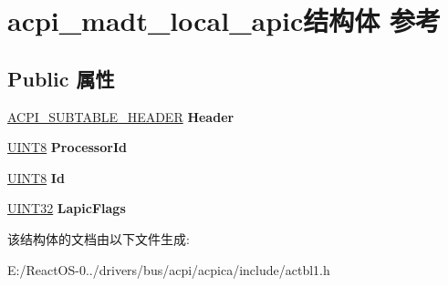 \hypertarget{structacpi__madt__local__apic}{}\section{acpi\+\_\+madt\+\_\+local\+\_\+apic结构体 参考}
\label{structacpi__madt__local__apic}
\subsection*{Public 属性}
\begin{DoxyCompactItemize}
\item 
\mbox{\label{structacpi__madt__local__apic_aeebea140ddc6fc6a265ee9de978cbe99}} 
\hyperlink{structacpi__subtable__header}{A\+C\+P\+I\+\_\+\+S\+U\+B\+T\+A\+B\+L\+E\+\_\+\+H\+E\+A\+D\+ER} {\bfseries Header}
\item 
\mbox{\label{structacpi__madt__local__apic_ae91b0a3cc43c5f7860c488665fadbc49}} 
\hyperlink{_processor_bind_8h_ab27e9918b538ce9d8ca692479b375b6a}{U\+I\+N\+T8} {\bfseries Processor\+Id}
\item 
\mbox{\label{structacpi__madt__local__apic_a42d0a74c710ebdbe1a39059320a18a0a}} 
\hyperlink{_processor_bind_8h_ab27e9918b538ce9d8ca692479b375b6a}{U\+I\+N\+T8} {\bfseries Id}
\item 
\mbox{\label{structacpi__madt__local__apic_a8b44d82f000fa0c308d73d410d48f372}} 
\hyperlink{_processor_bind_8h_ae1e6edbbc26d6fbc71a90190d0266018}{U\+I\+N\+T32} {\bfseries Lapic\+Flags}
\end{DoxyCompactItemize}


该结构体的文档由以下文件生成\+:\begin{DoxyCompactItemize}
\item 
E\+:/\+React\+O\+S-\/0../drivers/bus/acpi/acpica/include/actbl1.\+h\end{DoxyCompactItemize}
